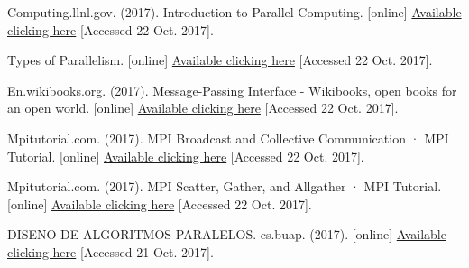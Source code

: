 \documentclass[fleqn,10pt]{SelfArx} %
\begin{document}
\begin{thebibliography}{9}
Computing.llnl.gov. (2017). Introduction to Parallel Computing. [online] \href{https://computing.llnl.gov/tutorials/parallel_comp/}{Available clicking here}  [Accessed 22 Oct. 2017].


Types of Parallelism. [online] \href{http://www.inf.ed.ac.uk/teaching/courses/pa/Notes/lecture02-types.pdf}{Available clicking here} [Accessed 22 Oct. 2017].


En.wikibooks.org. (2017). Message-Passing Interface - Wikibooks, open books for an open world. [online] \href{https://en.wikibooks.org/wiki/Message-Passing_Interface}{Available clicking here} [Accessed 22 Oct. 2017].

Mpitutorial.com. (2017). MPI Broadcast and Collective Communication · MPI Tutorial. [online] \href{http://mpitutorial.com/tutorials/mpi-broadcast-and-collective-communication/}{Available clicking here} [Accessed 22 Oct. 2017].

Mpitutorial.com. (2017). MPI Scatter, Gather, and Allgather · MPI Tutorial. [online] \href{
	http://mpitutorial.com/tutorials/mpi-scatter-gather-and-allgather/}{Available clicking here} [Accessed 22 Oct. 2017].

DISENO DE ALGORITMOS PARALELOS. cs.buap. (2017). [online] \href{https://www.cs.buap.mx/~mtovar/doc/ProgConc/ProgramacionParalela.pdf}{Available clicking here} [Accessed 21 Oct. 2017].

\end{thebibliography}




\end{document}
